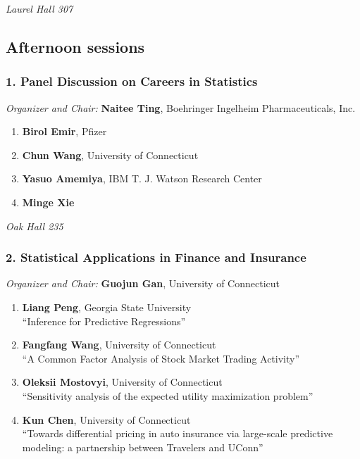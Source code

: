\emph{Laurel Hall 307} \\[.5em]

\subsection*{Afternoon sessions}

\subsubsection*{1. Panel Discussion on Careers in Statistics}

\emph{Organizer and Chair:} \textbf{Naitee Ting}, Boehringer Ingelheim Pharmaceuticals, Inc.

\begin{enumerate}
\item \textbf{Birol Emir}, Pfizer 
\item \textbf{Chun Wang}, University of Connecticut 
\item \textbf{Yasuo Amemiya}, IBM T. J. Watson Research Center 
\item \textbf{Minge Xie} 
\end{enumerate}

\emph{Oak Hall 235} \\[.5em]

\subsubsection*{2. Statistical Applications in Finance and Insurance}

\emph{Organizer and Chair:} \textbf{Guojun Gan}, University of Connecticut

\begin{enumerate}
\item \textbf{Liang Peng}, Georgia State University \\
``Inference for Predictive Regressions''
\item \textbf{Fangfang Wang}, University of Connecticut \\
``A Common Factor Analysis of  Stock Market Trading Activity''
\item \textbf{Oleksii Mostovyi}, University of Connecticut \\
``Sensitivity analysis of the expected utility maximization problem''
\item \textbf{Kun Chen}, University of Connecticut \\
``Towards differential pricing in auto insurance via large-scale predictive modeling: a partnership between Travelers and UConn''
\end{enumerate}

